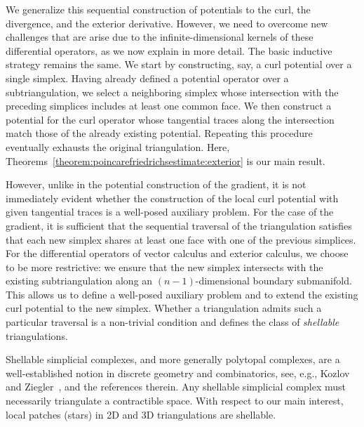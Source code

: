 \documentclass[10pt,a4paper]{article}
\begin{document}
We generalize this sequential construction of potentials to the curl, the divergence, and the exterior derivative. 
However, we need to overcome new challenges that are arise due to the infinite-dimensional kernels of these differential operators, as we now explain in more detail. 
The basic inductive strategy remains the same. 
We start by constructing, say, a curl potential over a single simplex. 
Having already defined a potential operator over a subtriangulation, we select a neighboring simplex whose intersection with the preceding simplices includes at least one common face. 
We then construct a potential for the curl operator whose tangential traces along the intersection match those of the already existing potential.
Repeating this procedure eventually exhausts the original triangulation. 
Here, Theorems~\ref{theorem:poincarefriedrichsestimate:exterior} is our main result. 


However, unlike in the potential construction of the gradient, it is not immediately evident whether the construction of the local curl potential with given tangential traces is a well-posed auxiliary problem. 
For the case of the gradient, it is sufficient that the sequential traversal of the triangulation satisfies that each new simplex shares at least one face with one of the previous simplices. 
For the differential operators of vector calculus and exterior calculus, we choose to be more restrictive: 
we ensure that the new simplex intersects with the existing subtriangulation along an $(n-1)$-dimensional boundary submanifold.
This allows us to define a well-posed auxiliary problem and to extend the existing curl potential to the new simplex. 
Whether a triangulation admits such a particular traversal is a non-trivial condition and defines the class of \emph{shellable} triangulations.

 
 
 
 
Shellable simplicial complexes, and more generally polytopal complexes, are a well-established notion in discrete geometry and combinatorics, see, e.g., Kozlov~\cite{kozlov2008combinatorial} and Ziegler~\cite{ziegler1995lectures}, and the references therein.
Any shellable simplicial complex must necessarily triangulate a contractible space. 
With respect to our main interest, local patches (stars) in 2D and 3D triangulations are shellable. 
\end{document}
